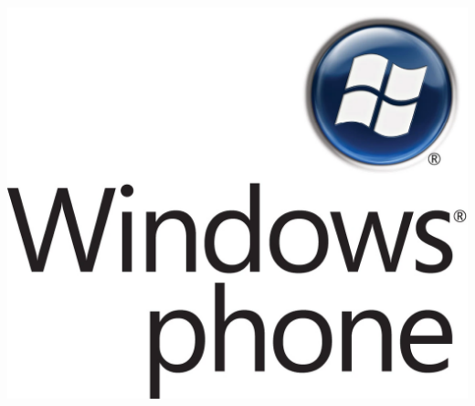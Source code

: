 \begin{frame}
\begin{columns}
\begin{center}
\includegraphics[width=0.95\linewidth]{00_IntroProgramacionYMoviles/WindowsPhone.png} 
\end{center}
\end{columns}
 
\end{frame}


